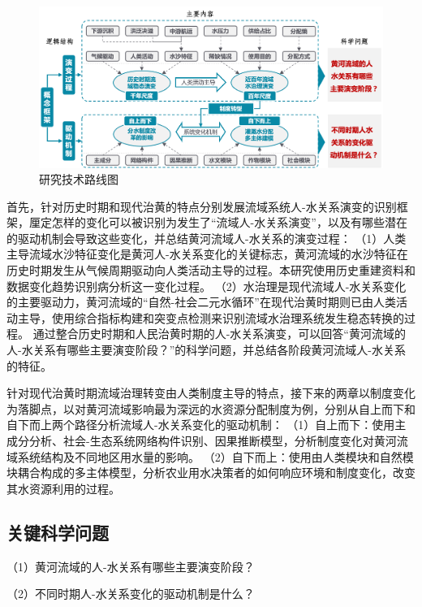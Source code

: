 \begin{figure}[!ht] %
    \includegraphics[width=\textwidth]{img/ch1/ch1_workflow.png}
    \caption{研究技术路线图}\label{ch1:fig:workflow}
\end{figure}

首先，针对历史时期和现代治黄的特点分别发展流域系统人-水关系演变的识别框架，厘定怎样的变化可以被识别为发生了“流域人-水关系演变”，以及有哪些潜在的驱动机制会导致这些变化，并总结黄河流域人-水关系的演变过程：
（1）人类主导流域水沙特征变化是黄河人-水关系变化的关键标志，黄河流域的水沙特征在历史时期发生从气候周期驱动向人类活动主导的过程。本研究使用历史重建资料和数据变化趋势识别病分析这一变化过程。
（2）水治理是现代流域人-水关系变化的主要驱动力，黄河流域的“自然-社会二元水循环”在现代治黄时期则已由人类活动主导，使用综合指标构建和突变点检测来识别流域水治理系统发生稳态转换的过程。
通过整合历史时期和人民治黄时期的人-水关系演变，可以回答“黄河流域的人-水关系有哪些主要演变阶段？”的科学问题，并总结各阶段黄河流域人-水关系的特征。

针对现代治黄时期流域治理转变由人类制度主导的特点，接下来的两章以制度变化为落脚点，以对黄河流域影响最为深远的水资源分配制度为例，分别从自上而下和自下而上两个路径分析流域人-水关系变化的驱动机制：
（1）自上而下：使用主成分分析、社会-生态系统网络构件识别、因果推断模型，分析制度变化对黄河流域系统结构及不同地区用水量的影响。
（2）自下而上：使用由人类模块和自然模块耦合构成的多主体模型，分析农业用水决策者的如何响应环境和制度变化，改变其水资源利用的过程。

\subsection{关键科学问题}

（1）黄河流域的人-水关系有哪些主要演变阶段？

（2）不同时期人-水关系变化的驱动机制是什么？
